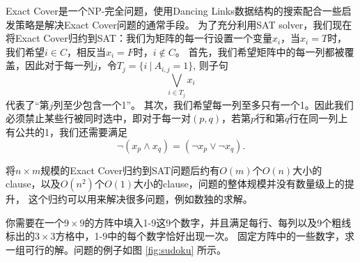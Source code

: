 Exact Cover是一个NP-完全问题，使用Dancing Links数据结构的搜索配合一些启发策略是解决Exact Cover问题的通常手段。
为了充分利用SAT solver，我们现在将Exact Cover归约到SAT：我们为矩阵的每一行设置一个变量$x_i$，当$x_i=T$时，我们希望$i\in C$，相反当$x_i=F$时，$i\notin C$。
首先，我们希望矩阵中的每一列都被覆盖，因此对于每一列$j$，令$T_j = \{ i~|~ A_{i,j} = 1\}$, 则子句
$$\bigvee_{i \in T_j} x_i$$
代表了``第$j$列至少包含一个1''。
其次，我们希望每一列至多只有一个1。因此我们必须禁止某些行被同时选中，即对于每一对$(p,q)$，若第$p$行和第$q$行在同一列上有公共的1，我们还需要满足
$$\neg (x_p \land x_q) = (\neg x_p \lor \neg x_q).$$

将$n\times m$规模的Exact Cover归约到SAT问题后约有$O(m)$个$O(n)$大小的clause，以及$O(n^2)$个$O(1)$大小的clause，问题的整体规模并没有数量级上的提升，
这个归约可以用来解决很多问题，例如数独的求解。

\begin{prob}
 你需要在一个$9\times9$的方阵中填入1-9这9个数字，并且满足每行、每列以及9个粗线标出的$3\times3$方格中，1-9中的每个数字恰好出现一次。
 固定方阵中的一些数字，求一组可行的解。问题的例子如图 \ref{fig:sudoku} 所示。
\end{prob}

